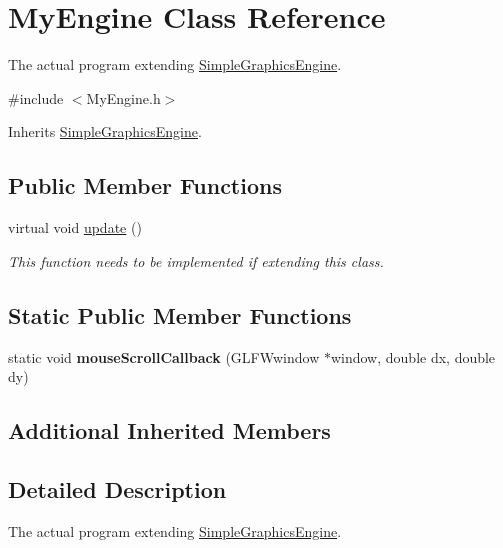 \hypertarget{class_my_engine}{\section{My\-Engine Class Reference}
\label{class_my_engine}
}


The actual program extending \hyperlink{class_simple_graphics_engine}{Simple\-Graphics\-Engine}.  




{\ttfamily \#include $<$My\-Engine.\-h$>$}



Inherits \hyperlink{class_simple_graphics_engine}{Simple\-Graphics\-Engine}.

\subsection*{Public Member Functions}
\begin{DoxyCompactItemize}
\item 
\hypertarget{class_my_engine_aefc0b3c6344a6fa72e9afe4efcf7546a}{virtual void \hyperlink{class_my_engine_aefc0b3c6344a6fa72e9afe4efcf7546a}{update} ()}\label{class_my_engine_aefc0b3c6344a6fa72e9afe4efcf7546a}

\begin{DoxyCompactList}\small\item\em This function needs to be implemented if extending this class. \end{DoxyCompactList}\end{DoxyCompactItemize}
\subsection*{Static Public Member Functions}
\begin{DoxyCompactItemize}
\item 
\hypertarget{class_my_engine_a28def44770e06b107f217938ebd8da37}{static void {\bfseries mouse\-Scroll\-Callback} (G\-L\-F\-Wwindow $\ast$window, double dx, double dy)}\label{class_my_engine_a28def44770e06b107f217938ebd8da37}

\end{DoxyCompactItemize}
\subsection*{Additional Inherited Members}


\subsection{Detailed Description}
The actual program extending \hyperlink{class_simple_graphics_engine}{Simple\-Graphics\-Engine}. 

